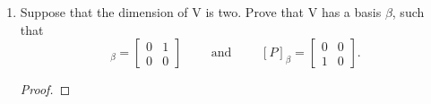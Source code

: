 \documentclass[11pt]{scrartcl}
\begin{document}
\begin{enumerate}[label=\alph*.]
{\begin{proof}
		      Thus, $dim(N_T) \leq dim(N_P)$ because  $dim(P(N_T)) \leq dim(N_T)$.\\\-\\
		      Thus, $dim(N_P) = dim(N_T) = n = m$.
		      \begin{align*}
			      dim(V) & = dim(N_T) + dim(N_P) \\
			             & = n + m               \\
			             & = n + n = m + m       \\
			             & = 2n = 2m
		      \end{align*}

		      Therefore, $dim(V)$ is even.
	      \end{proof}
	      }
	\item{
	      Suppose that the dimension of $\mathrm{V}$ is two. Prove that $\mathrm{V}$ has a basis $\beta$, such that
	      \begin{equation}
		      [T]_{\beta} = \left [ \begin{array}{cc}
				      0 & 1 \\
				      0 & 0
			      \end{array} \right] \qquad \text{ and } \qquad [P]_{\beta} = \left [ \begin{array}{cc}
				      0 & 0 \\
				      1 & 0
			      \end{array} \right] .
	      \end{equation}
	      \begin{proof}

	      \end{proof}
	      }
\end{enumerate}
\end{document}
